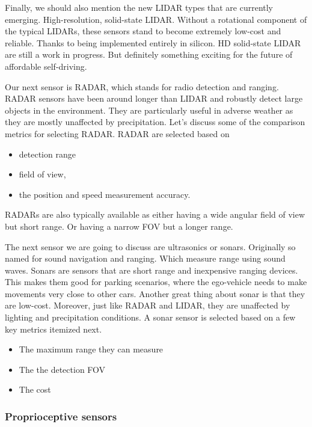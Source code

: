 Finally, we should also mention the new
LIDAR types that are currently emerging. High-resolution, solid-state LIDAR. Without a rotational component
of the typical LIDARs, these sensors stand to become
extremely low-cost and reliable. Thanks to being implemented
entirely in silicon. HD solid-state LIDAR
are still a work in progress. But definitely something exciting for
the future of affordable self-driving. 


Our next sensor is RADAR, which stands for radio detection and ranging. RADAR sensors have been
around longer than LIDAR and robustly detect large
objects in the environment. They are particularly useful in adverse
weather as they are mostly unaffected by precipitation. Let's discuss some of the comparison
metrics for selecting RADAR. RADAR are selected based on

\begin{itemize}
\item detection range
\item field of view, 
\item the position and speed measurement accuracy. 
\end{itemize}

RADARs are also typically available as either having a wide angular field of view but short range. 
Or having a narrow FOV but a longer range. 

The next sensor we are going to discuss are ultrasonics or sonars. Originally so named for
sound navigation and ranging. Which measure range using sound waves. Sonars are sensors that are short
range and inexpensive ranging devices. This makes them good for parking scenarios, where the ego-vehicle needs to make
movements very close to other cars. Another great thing about sonar is that they are low-cost. Moreover, just like RADAR and LIDAR,
they are unaffected by lighting and precipitation conditions. A sonar sensor is selected based
on a few key metrics itemized next. 

\begin{itemize}
\item The maximum range they can measure
\item The the detection FOV
\item The cost
\end{itemize}

\subsubsection{Proprioceptive sensors}

